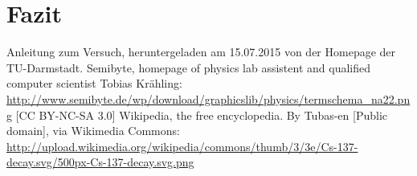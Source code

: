 \documentclass[bigchapter,colorback,accentcolor=tud4b,linedtoc,11pt]{tudreport}
\begin{document}
\chapter{Fazit}

\cleardoublepage{}
\newpage
\begin{thebibliography}{100}
   {Anleitung zum Versuch, heruntergeladen am 15.07.2015 von der Homepage der TU-Darmstadt.} 
   {Semibyte, homepage of physics lab assistent and qualified
      computer scientist Tobias Krähling:
      \url{http://www.semibyte.de/wp/download/graphicslib/physics/termschema_na22.png}
    [CC BY-NC-SA 3.0]}
   {Wikipedia, the free encyclopedia. By Tubas-en [Public
      domain], via Wikimedia Commons: \url{http://upload.wikimedia.org/wikipedia/commons/thumb/3/3e/Cs-137-decay.svg/500px-Cs-137-decay.svg.png}}
\end{thebibliography}
\end{document}
